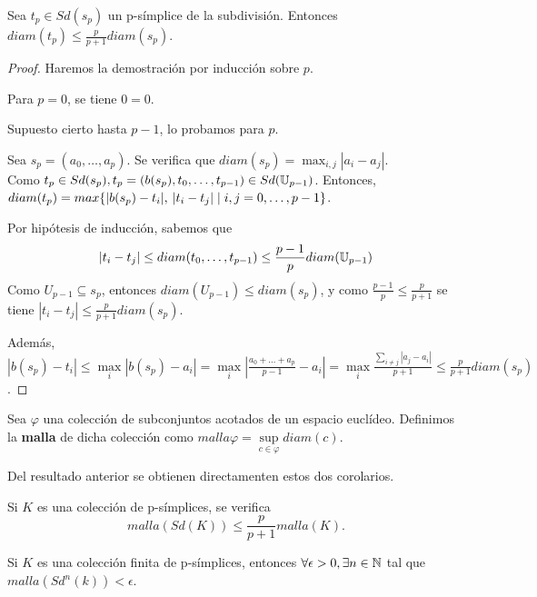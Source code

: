 \begin{proposition}
  Sea $t_p \in Sd(s_p)$ un p-símplice de la subdivisión. Entonces $diam(t_p) \leq \frac{p}{p+1} diam(s_p)$.
\end{proposition}

\begin{proof}
  Haremos la demostración por inducción sobre $p$.

  Para $p = 0$, se tiene $0 = 0$.

  Supuesto cierto hasta $p-1$, lo probamos para $p$.

  Sea $s_p = (a_0, \dots, a_p)$. Se verifica que $diam(s_p) = \max_{i,j} |a_i - a_j|$. \\
  Como $t_p \in Sd(s_p), t_p = (b(s_p), t_0, \dots, t_{p-1}) \in Sd({\mathbb U}_{p-1})$.
  Entonces, $diam(t_p) = max\{|b(s_p) - t_i|,\hspace{0.2em} |t_i - t_j| \mid i,j = 0, \dots, p-1\}$.

  Por hipótesis de inducción, sabemos que
  \[|t_i - t_j| \leq diam(t_0, \dots, t_{p-1}) \leq \frac{p-1}{p} diam({\mathbb U}_{p-1})\]
  Como $U_{p-1} \subseteq s_p$, entonces $diam(U_{p-1}) \leq diam(s_p)$, y como $\frac{p-1}{p} \leq \frac{p}{p+1}$
  se tiene $|t_i - t_j| \leq \frac{p}{p+1} diam(s_p)$.

  Además, $|b(s_p) - t_i| \leq \max\limits_i |b(s_p) - a_i| = \max\limits_i |\frac{a_0 + \dots + a_p}{p-1} - a_i| =
  \max\limits_i \frac{\sum\limits_{i \neq j} |a_j - a_i|}{p+1} \leq \frac{p}{p+1} diam(s_p)$.
\end{proof}

\begin{definition}
  Sea $\varphi$ una colección de subconjuntos acotados de un espacio euclídeo. Definimos la \textbf{malla} de
  dicha colección como $malla \varphi = \sup\limits_{c \in \varphi} diam(c)$.
\end{definition}

Del resultado anterior se obtienen directamenten estos dos corolarios.

\begin{corollary}
  Si $K$ es una colección de p-símplices, se verifica \[malla(Sd(K)) \leq \frac{p}{p+1} malla(K). \]
\end{corollary}

\begin{corollary}
  Si $K$ es una colección finita de p-símplices, entonces $\forall \epsilon > 0, \exists n \in {\mathbb N}$ tal que \\$malla(Sd^n(k)) < \epsilon$.
\end{corollary}

